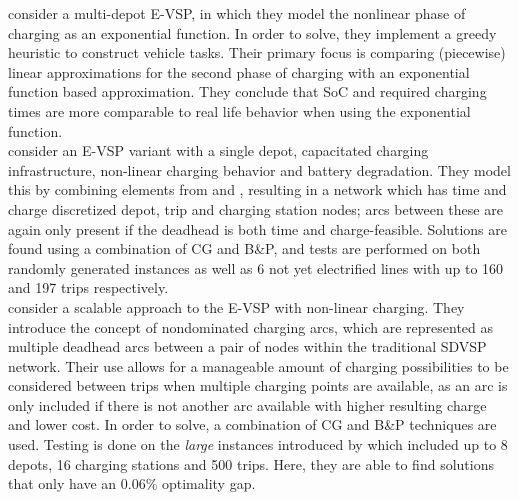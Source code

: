 \documentclass[]{article}
\begin{document}
\citet{Olsen2020} consider a multi-depot E-VSP, in which they model the nonlinear phase of charging as an exponential function. In order to solve, they implement a greedy heuristic to construct vehicle tasks. Their primary focus is comparing (piecewise) linear approximations for the second phase of charging with an exponential function based approximation. They conclude that SoC and required charging times are more comparable to real life behavior when using the exponential function. \\
\citet{Zhang2021} consider an E-VSP variant with a single depot, capacitated charging infrastructure, non-linear charging behavior and battery degradation. They model this by combining elements from \citet{Li2014} and \citet{vanKootenNiekerk2017}, resulting in a network which has time and charge discretized depot, trip and charging station nodes; arcs between these are again only present if the deadhead is both time and charge-feasible. Solutions are found using a combination of CG and B\&P, and tests are performed on both randomly generated instances as well as 6 not yet electrified lines with up to 160 and 197 trips respectively. \\
\citet{Parmentier2023} consider a scalable approach to the E-VSP with non-linear charging. They introduce the concept of nondominated charging arcs, which are represented as multiple deadhead arcs between a pair of nodes within the traditional SDVSP network. Their use allows for a manageable amount of charging possibilities to be considered between trips when multiple charging points are available, as an arc is only included if there is not another arc available with higher resulting charge and lower cost. In order to solve, a combination of CG and B\&P techniques are used. Testing is done on the \textit{large} instances introduced by \citet{Wen2016} which included up to 8 depots, 16 charging stations and 500 trips. Here, they are able to find solutions that only have an 0.06\% optimality gap. \\
\end{document}
